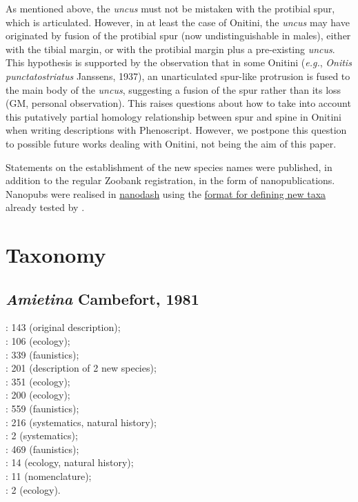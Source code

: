 \documentclass[fleqn,10pt,lineno]{wlpeerj}
\begin{document}
As mentioned above, the \textit{uncus} must not be mistaken with the protibial spur, which is articulated. However, in at least the case of Onitini, the \textit{uncus} may have originated by fusion of the protibial spur (now undistinguishable in males), either with the tibial margin, or with the protibial margin plus a pre-existing \textit{uncus}. This hypothesis is supported by the observation that in some Onitini (\textit{e.g.}, \textit{Onitis punctatostriatus} Janssens, 1937), an unarticulated spur-like protrusion is fused to the main body of the \textit{uncus}, suggesting a fusion of the spur rather than its loss (GM, personal observation). This raises questions about how to take into account this putatively partial homology relationship between spur and spine in Onitini when writing descriptions with Phenoscript. However, we postpone this question to possible future works dealing with Onitini, not being the aim of this paper.

Statements on the establishment of the new species names were published, in addition to the regular Zoobank registration, in the form of nanopublications. Nanopubs were realised in \href{https://nanodash.petapico.org/publish?}{nanodash} using the \href{https://nanodash.petapico.org/publish?11&template=https://w3id.org/np/RAa7sIgQ77jJL4HYYGVH8sNu1YEKCH3F-CHqHrgbWWGS4}{format for defining new taxa} already tested by \cite{montanaro2024beyond}.


\section*{Taxonomy}

\subsection*{\textit{Amietina} Cambefort, 1981}

\cite{cambefort1981amietina}: 143 (original description);\\
\cite{cambefort1984etude}: 106 (ecology);\\
\cite{cambefort1985coleopteres}: 339 (faunistics);\\
\cite{branco1988deux}: 201 (description of 2 new species);\\
\cite{nummelin1989dung}: 351 (ecology);\\
\cite{cambefort1991dung}: 200 (ecology);\\
\cite{cambefort2003nimba}: 559 (faunistics);\\
\cite{davis2008african}: 216 (systematics, natural history);\\
\cite{josso2008unidentis}: 2 (systematics);\\
\cite{moretto2010bayanga}: 469 (faunistics);\\
\cite{moretto2010onthophagus}: 14 (ecology, natural history);\\
\cite{branco2014scarabaeidae}: 11 (nomenclature);\\
\cite{philips2023dung}: 2 (ecology).
\end{document}
